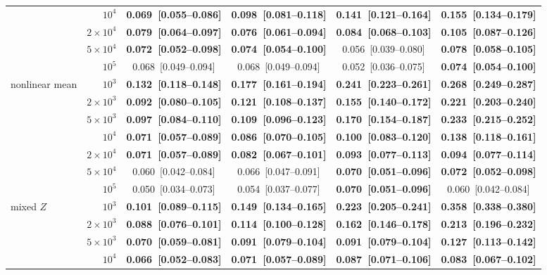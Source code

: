 \begin{table}[p]
{\begin{tabular}{lrcccc}
 & $10^4$ & \textbf{0.069~[0.055--0.086]} & \textbf{0.098~[0.081--0.118]} & \textbf{0.141~[0.121--0.164]} & \textbf{0.155~[0.134--0.179]} \\
 & $2\times10^4$ & \textbf{0.079~[0.064--0.097]} & \textbf{0.076~[0.061--0.094]} & \textbf{0.084~[0.068--0.103]} & \textbf{0.105~[0.087--0.126]} \\
 & $5\times10^4$ & \textbf{0.072~[0.052--0.098]} & \textbf{0.074~[0.054--0.100]} & 0.056~[0.039--0.080] & \textbf{0.078~[0.058--0.105]} \\
 & $10^5$ & 0.068~[0.049--0.094] & 0.068~[0.049--0.094] & 0.052~[0.036--0.075] & \textbf{0.074~[0.054--0.100]} \\
\midrule
nonlinear mean & $10^3$ & \textbf{0.132~[0.118--0.148]} & \textbf{0.177~[0.161--0.194]} & \textbf{0.241~[0.223--0.261]} & \textbf{0.268~[0.249--0.287]} \\
 & $2\times10^3$ & \textbf{0.092~[0.080--0.105]} & \textbf{0.121~[0.108--0.137]} & \textbf{0.155~[0.140--0.172]} & \textbf{0.221~[0.203--0.240]} \\
 & $5\times10^3$ & \textbf{0.097~[0.084--0.110]} & \textbf{0.109~[0.096--0.123]} & \textbf{0.170~[0.154--0.187]} & \textbf{0.233~[0.215--0.252]} \\
 & $10^4$ & \textbf{0.071~[0.057--0.089]} & \textbf{0.086~[0.070--0.105]} & \textbf{0.100~[0.083--0.120]} & \textbf{0.138~[0.118--0.161]} \\
 & $2\times10^4$ & \textbf{0.071~[0.057--0.089]} & \textbf{0.082~[0.067--0.101]} & \textbf{0.093~[0.077--0.113]} & \textbf{0.094~[0.077--0.114]} \\
 & $5\times10^4$ & 0.060~[0.042--0.084] & 0.066~[0.047--0.091] & \textbf{0.070~[0.051--0.096]} & \textbf{0.072~[0.052--0.098]} \\
 & $10^5$ & 0.050~[0.034--0.073] & 0.054~[0.037--0.077] & \textbf{0.070~[0.051--0.096]} & 0.060~[0.042--0.084] \\
\midrule
mixed $Z$ & $10^3$ & \textbf{0.101~[0.089--0.115]} & \textbf{0.149~[0.134--0.165]} & \textbf{0.223~[0.205--0.241]} & \textbf{0.358~[0.338--0.380]} \\
 & $2\times10^3$ & \textbf{0.088~[0.076--0.101]} & \textbf{0.114~[0.100--0.128]} & \textbf{0.162~[0.146--0.178]} & \textbf{0.213~[0.196--0.232]} \\
 & $5\times10^3$ & \textbf{0.070~[0.059--0.081]} & \textbf{0.091~[0.079--0.104]} & \textbf{0.091~[0.079--0.104]} & \textbf{0.127~[0.113--0.142]} \\
 & $10^4$ & \textbf{0.066~[0.052--0.083]} & \textbf{0.071~[0.057--0.089]} & \textbf{0.087~[0.071--0.106]} & \textbf{0.083~[0.067--0.102]} \\

\end{tabular}}
\end{table}
